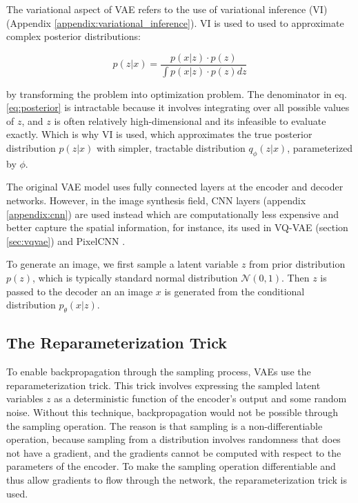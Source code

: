 The variational aspect of VAE refers to the use of variational inference (VI) (Appendix \ref{appendix:variational_inference}). VI is used to used to approximate complex posterior distributions: 

\begin{equation}
p(z|x) = \frac{p(x|z) \cdot p(z)}{\int p(x|z) \cdot p(z) dz}
\label{eq:posterior}
\end{equation}

by transforming the problem into optimization problem. The denominator in eq. \ref{eq:posterior} is intractable because it involves integrating over all possible values of $z$, and $z$ is often relatively high-dimensional and its infeasible to evaluate exactly. Which is why VI is used, which approximates the true posterior distribution $p(z|x)$ with simpler, tractable distribution $q_\phi (z|x)$, parameterized by $\phi$.

The original VAE model uses fully connected layers at the encoder and decoder networks. However, in the image synthesis field, CNN layers (appendix \ref{appendix:cnn}) are used instead which are computationally less expensive and better capture the spatial information, for instance, its used in VQ-VAE (section \ref{sec:vqvae}) and PixelCNN \cite{pixelcnn}.

To generate an image, we first sample a latent variable $z$ from prior distribution $p(z)$, which is typically standard normal distribution $\mathcal{N}(0, 1)$. Then $z$ is passed to the decoder an an image $x$ is generated from the conditional distribution $p_\theta (x|z)$. 

\subsection{The Reparameterization Trick}
To enable backpropagation through the sampling process, VAEs use the reparameterization trick. This trick involves expressing the sampled latent variables $z$ as a deterministic function of the encoder's output and some random noise. Without this technique, backpropagation would not be possible through the sampling operation. The reason is that sampling is a non-differentiable operation, because sampling from a distribution involves randomness that does not have a gradient, and the gradients cannot be computed with respect to the parameters of the encoder. To make the sampling operation differentiable and thus allow gradients to flow through the network, the reparameterization trick is used. 

